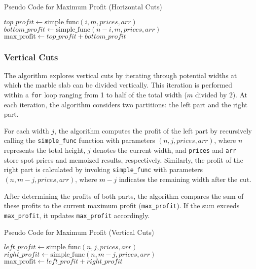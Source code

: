 \documentclass{article}
\begin{document}
\begin{algorithm}
\caption{Pseudo Code for Maximum Profit (Horizontal Cuts)}
\begin{algorithmic}[1]
    \State $top\_profit \gets \text{simple\_func}(i, m, prices, arr)$
    \State $bottom\_profit \gets \text{simple\_func}(n - i, m, prices, arr)$
        \State $\text{max\_profit} \gets top\_profit + bottom\_profit$
    \EndIf
\EndFor
\end{algorithmic}
\end{algorithm}



\subsubsection{Vertical Cuts}

The algorithm explores vertical cuts by iterating through potential widths at which the marble slab can be divided vertically. This iteration is performed within a \texttt{for} loop ranging from 1 to half of the total width ($m$ divided by 2). At each iteration, the algorithm considers two partitions: the left part and the right part.

For each width $j$, the algorithm computes the profit of the left part by recursively calling the \texttt{simple\_func} function with parameters $(n, j, prices, arr)$, where $n$ represents the total height, $j$ denotes the current width, and \texttt{prices} and \texttt{arr} store spot prices and memoized results, respectively. Similarly, the profit of the right part is calculated by invoking \texttt{simple\_func} with parameters $(n, m - j, prices, arr)$, where $m - j$ indicates the remaining width after the cut.

After determining the profits of both parts, the algorithm compares the sum of these profits to the current maximum profit (\texttt{max\_profit}). If the sum exceeds \texttt{max\_profit}, it updates \texttt{max\_profit} accordingly.


\begin{algorithm}
\caption{Pseudo Code for Maximum Profit (Vertical Cuts)}
\begin{algorithmic}[1]
    \State $left\_profit \gets \text{simple\_func}(n, j, prices, arr)$
    \State $right\_profit \gets \text{simple\_func}(n, m - j, prices, arr)$
        \State $\text{max\_profit} \gets left\_profit + right\_profit$
    \EndIf
\EndFor
\end{algorithmic}
\end{algorithm}
\end{document}

